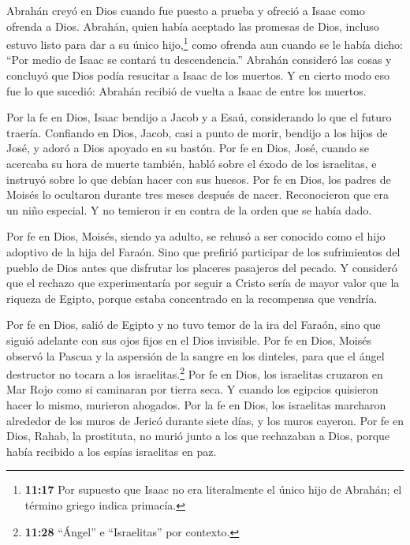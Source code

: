  Abrahán creyó en Dios cuando fue puesto a prueba y ofreció
a Isaac como ofrenda a Dios. Abrahán, quien había aceptado las promesas
de Dios, incluso estuvo listo para dar a su único hijo,\footnote{\textbf{11:17}
  Por supuesto que Isaac no era literalmente el único hijo de Abrahán;
  el término griego indica primacía.} como ofrenda  aun
cuando se le había dicho: ``Por medio de Isaac se contará tu
descendencia.''  Abrahán consideró las cosas y concluyó que
Dios podía resucitar a Isaac de los muertos. Y en cierto modo eso fue lo
que sucedió: Abrahán recibió de vuelta a Isaac de entre los muertos.

 Por la fe en Dios, Isaac bendijo a Jacob y a Esaú,
considerando lo que el futuro traería.  Confiando en Dios,
Jacob, casi a punto de morir, bendijo a los hijos de José, y adoró a
Dios apoyado en su bastón.  Por fe en Dios, José, cuando se
acercaba su hora de muerte también, habló sobre el éxodo de los
israelitas, e instruyó sobre lo que debían hacer con sus huesos.
 Por fe en Dios, los padres de Moisés lo ocultaron durante
tres meses después de nacer. Reconocieron que era un niño especial. Y no
temieron ir en contra de la orden que se había dado.

 Por fe en Dios, Moisés, siendo ya adulto, se rehusó a ser
conocido como el hijo adoptivo de la hija del Faraón.  Sino
que prefirió participar de los sufrimientos del pueblo de Dios antes que
disfrutar los placeres pasajeros del pecado.  Y consideró
que el rechazo que experimentaría por seguir a Cristo sería de mayor
valor que la riqueza de Egipto, porque estaba concentrado en la
recompensa que vendría.

 Por fe en Dios, salió de Egipto y no tuvo temor de la ira
del Faraón, sino que siguió adelante con sus ojos fijos en el Dios
invisible.  Por fe en Dios, Moisés observó la Pascua y la
aspersión de la sangre en los dinteles, para que el ángel destructor no
tocara a los israelitas.\footnote{\textbf{11:28} ``Ángel'' e
  ``Israelitas'' por contexto.}  Por fe en Dios, los
israelitas cruzaron en Mar Rojo como si caminaran por tierra seca. Y
cuando los egipcios quisieron hacer lo mismo, murieron ahogados.
 Por la fe en Dios, los israelitas marcharon alrededor de
los muros de Jericó durante siete días, y los muros cayeron.
 Por fe en Dios, Rahab, la prostituta, no murió junto a los
que rechazaban a Dios, porque había recibido a los espías israelitas en
paz.

